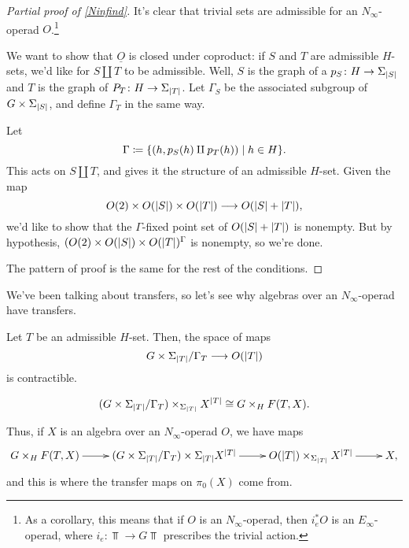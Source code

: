 \begin{proof}[Partial proof of \cref{Ninfind}]
It's clear that trivial sets are admissible for an $N_\infty$-operad $O$.\footnote{As a corollary, this means that
if $O$ is an $N_\infty$-operad, then $i_e^*O$ is an $E_\infty$-operad, where $i_e\colon\Top\to G\Top$ prescribes
the trivial action.}

We want to show that $\underline O$ is closed under coproduct: if $S$ and $T$ are admissible $H$-sets, we'd like
for $S\amalg T$ to be admissible. Well, $S$ is the graph of a $p_S\colon H\to\Sigma_{\lvert S\rvert}$ and $T$ is the graph
of $P_T\colon H\to\Sigma_{\lvert T\rvert}$. Let $\Gamma_S$ be the associated subgroup of $G\times\Sigma_{\lvert S\rvert}$, and
define $\Gamma_T$ in the same way.

Let
\[\Gamma\coloneqq \{(h, p_S(h)\amalg p_T(h))\mid h\in H\}.\]
This acts on $S\amalg T$, and gives it the structure of an admissible $H$-set. Given the map
\[O(2)\times O(\lvert S\rvert)\times O(\lvert T\rvert)\longrightarrow O(\lvert S\rvert + \lvert T\rvert),\]
we'd like to show that the $\Gamma$-fixed point set of $O(\lvert S\rvert + \lvert T\rvert)$ is nonempty. But by hypothesis,
$(O(2)\times O(\lvert S\rvert)\times O(\lvert T\rvert)^\Gamma$ is nonempty, so we're done.

The pattern of proof is the same for the rest of the conditions.
\end{proof}
We've been talking about transfers, so let's see why algebras over an $N_\infty$-operad have
transfers.

Let $T$ be an admissible $H$-set. Then, the space of maps
\[G\times\Sigma_{\lvert T\rvert}/\Gamma_T\longrightarrow O(\lvert T\rvert)\]
is contractible.
\begin{lem}
\[(G\times\Sigma_{\lvert T\rvert}/\Gamma_T)\times_{\Sigma_{\lvert T\rvert}} X^{\lvert T\rvert} \cong G\times_H F(T,X).\]
\end{lem}
Thus, if $X$ is an algebra over an $N_\infty$-operad $O$, we have maps
\[\xymatrix{
	G\times_H F(T,X)\ar[r] & (G\times\Sigma_{\abs T}/\Gamma_T)\times\Sigma_{\abs T} X^{\abs T}\ar[r] & O(\abs
	T)\times_{\Sigma_{\abs T}} X^{\abs T}\ar[r] & X,
}\]
and this is where the transfer maps on $\pi_0(X)$ come from.

